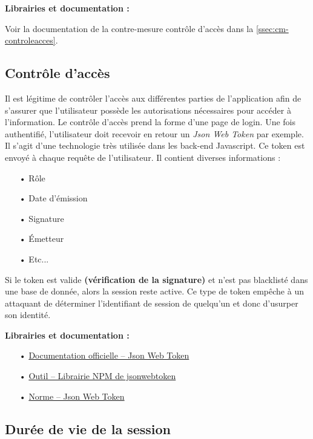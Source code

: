 \medskip
\textbf{Librairies et documentation :}

Voir la documentation de la contre-mesure contrôle d'accès dans la \autoref{ssec:cm-controleacces}.

\subsection{Contrôle d'accès}
\label{ssec:cm-controleacces}

Il est légitime de contrôler l'accès aux différentes parties de l'application afin de s'assurer que l'utilisateur possède les autorisations nécessaires pour accéder à l'information. Le contrôle d'accès prend la forme d'une page de login. Une fois authentifié, l'utilisateur doit recevoir en retour un \emph{Json Web Token} par exemple. Il s'agit d'une technologie très utilisée dans les back-end Javascript. Ce token est envoyé à chaque requête de l'utilisateur. Il contient diverses informations :
\begin{itemize}
\item[•] Rôle
\item[•] Date d'émission
\item[•] Signature
\item[•] Émetteur
\item[•] Etc...
\end{itemize}
\medskip

Si le token est valide \textbf{(vérification de la signature)} et n'est pas blacklisté dans une base de donnée, alors la session reste active. Ce type de token empêche à un attaquant de déterminer l'identifiant de session de quelqu'un et donc d'usurper son identité.

\medskip
\textbf{Librairies et documentation :}

\begin{itemize}
\item[•] \href{https://jwt.io/}{Documentation officielle -- Json Web Token}
\item[•] \href{https://www.npmjs.com/package/jsonwebtoken}{Outil -- Librairie NPM de jsonwebtoken}
\item[•] \href{https://tools.ietf.org/html/rfc7519}{Norme -- Json Web Token}
\end{itemize}

\subsection{Durée de vie de la session}
\label{ssec:cm-dureeviesession}


